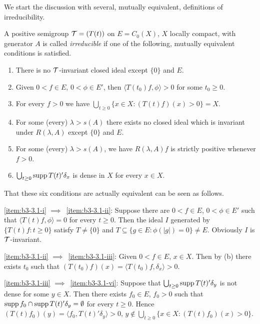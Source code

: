We start the discussion with several, mutually equivalent, definitions of irreducibility. 
\begin{definition}\label{def:b3-3.1}
A positive semigroup $\mathcal{T} = (T(t))$ on $E = C_{0}(X)$, $X$ locally compact, with generator $A$ is called \emph{irreducible} if one of the following, mutually equivalent conditions is satisfied.
\begin{enumerate}[\upshape (a)]

\item\label{item:b3-3.1-i}
There is no $\mathcal{T}$-invariant closed ideal except $\{0\}$ and $E$.
	
\item\label{item:b3-3.1-ii}
Given $0 < f \in E$, $0 < \phi \in E'$, then $\langle T(t_{0})f,\phi \rangle > 0$ for some $t_{0} \geq 0$.
	
\item\label{item:b3-3.1-iii}
For every $f > 0$ we have 
$\bigcup_{t \geq 0}\{x \in X \colon (T(t)f)(x) > 0\} = X$.
	
\item\label{item:b3-3.1-iv}
For some (every) $\lambda > s(A)$ there exists no closed ideal which is invariant under $R(\lambda,A)$ except $\{0\}$ and $E$.
	
\item\label{item:b3-3.1-v}
For some (every) $\lambda > s(A)$, we have $R(\lambda,A)f$ is strictly positive whenever $f > 0$.
	
\item\label{item:b3-3.1-vi}
$\bigcup_{t \geq 0}\supp T(t)'\delta_{x}$ is dense in $X$ for every $x \in X$.

\end{enumerate}
\end{definition}
That these six conditions are actually equivalent can be seen as follows.

\ref{item:b3-3.1-i} $\implies$~\ref{item:b3-3.1-ii}: Suppose there are $0 < f \in E$, $0 < \phi \in E'$ such that $\langle T(t)f,\phi \rangle = 0$ for every $t \geq 0$.
Then the ideal $I$ generated by $\{T(t)f \colon t \geq 0\}$ satisfy $T \neq \{0\}$  and  $T \subseteq \{g \in E \colon \phi(|g|) = 0\} \neq E$.
Obviously $I$ is $\mathcal{T}$-invariant.

\ref{item:b3-3.1-ii} $\implies$~\ref{item:b3-3.1-iii}: Given $0 < f \in E$, $x \in X$.
Then by (b) there exists $t_{0}$ such that $(T(t_{0})f)(x) = \langle T(t_{0})f,\delta_{x} \rangle > 0$.

\ref{item:b3-3.1-iii} $\implies$~\ref{item:b3-3.1-vi}: Suppose that $\bigcup_{t \geq 0}\supp T(t)'\delta_{y}$ is not dense for some $y \in X$.
Then there exists $f_{0} \in E$, $f_{0} > 0$ such that
$\mathop{}\!\mathrm{supp}\, f_{0} \cap \mathop{}\!\mathrm{supp}\, T(t)'\delta_{y} = \emptyset$ for every $t \geq 0$.
Hence $(T(t)f_{0})(y) = \langle f_{0},T(t)'\delta_{y} \rangle > 0$, \ie $y \notin \bigcup_{t\geq 0}\{x \in X \colon (T(t)f_{0})(x) > 0\}$.

